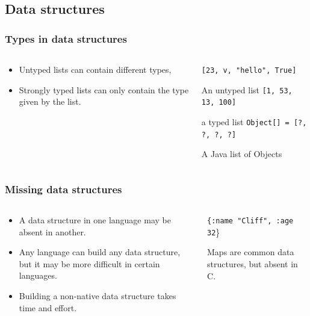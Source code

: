 \documentclass{beamer}
\newcommand{\linespace}{\vskip 0.25cm}
\begin{document}
\subsection{Data structures}
\begin{frame}
  \frametitle{Types in data structures}
  
  \begin{columns}
  \begin{column}{0.5\textwidth}
  \begin{itemize}
  	\item Untyped lists can contain different types,
  	\item Strongly typed lists can only contain the type given by the list.
  \end{itemize}
  \end{column}
  
  \begin{column}{0.5\textwidth}
  {\tt [23, v, "hello", True]}
  
   An untyped list
\linespace   
  {\tt [1, 53, 13, 100]}
  
  a typed list 
\linespace	
  {\tt Object[] = [?, ?, ?, ?]}
  
  A Java list of Objects
  \end{column}
  \end{columns}
\end{frame}
\begin{frame}
  \frametitle{Missing data structures}
  \begin{columns}
  \begin{column}{0.5\textwidth}
  \begin{itemize}
  \item A data structure in one language may be absent in another.
  \item Any language can build any data structure, but it may be more difficult in certain languages.
  \item Building a non-native data structure takes time and effort.
  \end{itemize}
  
  \end{column}
  \begin{column}{0.6\textwidth}
  {\tt \{:name "Cliff", :age 32}\}
  
  Maps are common data structures, but absent in C.
  \end{column}
  \end{columns}
\end{frame}
\end{document}
